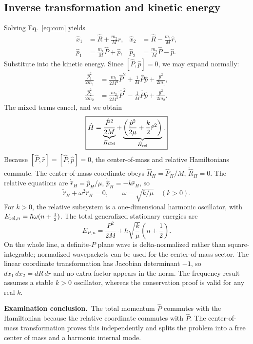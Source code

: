 \documentclass[11pt,a4paper]{article}
\theoremstyle{definition}
\newcommand{\exam}[1]{\par\medskip\noindent\textbf{Examination conclusion.}\ #1\par}
\begin{document}
\subsection{Inverse transformation and kinetic energy}
Solving Eq.~\eqref{eq:com} yields
\begin{align}
\hat x_1&=\hat R+\frac{m_2}{M}\hat r,&\hat x_2&=\hat R-\frac{m_1}{M}\hat r,\\
\hat p_1&=\frac{m_1}{M}\hat P+\hat p,&\hat p_2&=\frac{m_2}{M}\hat P-\hat p.
\end{align}
Substitute into the kinetic energy. Since \([\hat P,\hat p]=0\), we may expand normally:
\begin{align}
\frac{\hat p_1^2}{2m_1}&=\frac{m_1}{2M^2}\hat P^2+\frac1M\hat P\hat p+\frac{\hat p^2}{2m_1},\\
\frac{\hat p_2^2}{2m_2}&=\frac{m_2}{2M^2}\hat P^2-\frac1M\hat P\hat p+\frac{\hat p^2}{2m_2}.
\end{align}
The mixed terms cancel, and we obtain
\begin{equation}
\boxed{\hat H=\underbrace{\frac{\hat P^2}{2M}}_{\hat H_{\rm CM}}
+\underbrace{\left(\frac{\hat p^2}{2\mu}+\frac{k}{2}\hat r^2\right)}_{\hat H_{\rm rel}}.}
\label{eq:separate}
\end{equation}
Because \([\hat P,\hat r]=[\hat P,\hat p]=0\), the center-of-mass and relative Hamiltonians commute. The center-of-mass coordinate obeys \(\dot{\hat R}_H=\hat P_H/M\), \(\ddot{\hat R}_H=0\). The relative equations are \(\dot{\hat r}_H=\hat p_H/\mu\), \(\dot{\hat p}_H=-k\hat r_H\), so
\begin{equation}
\ddot{\hat r}_H+\omega^2\hat r_H=0,\qquad \omega=\sqrt{k/\mu}\quad(k>0).
\end{equation}
For \(k>0\), the relative subsystem is a one-dimensional harmonic oscillator, with \(E_{{\rm rel},n}=\hbar\omega(n+\frac12)\). The total generalized stationary energies are
\begin{equation}
\boxed{E_{P,n}=\frac{P^2}{2M}+\hbar\sqrt{\frac{k}{\mu}}\left(n+\frac12\right).}
\end{equation}
On the whole line, a definite-\(P\) plane wave is delta-normalized rather than square-integrable; normalized wavepackets can be used for the center-of-mass sector. The linear coordinate transformation has Jacobian determinant \(-1\), so \(dx_1\,dx_2=dR\,dr\) and no extra factor appears in the norm. The frequency result assumes a stable \(k>0\) oscillator, whereas the conservation proof is valid for any real \(k\).
\exam{The total momentum \(\hat P\) commutes with the Hamiltonian because the relative coordinate commutes with \(\hat P\). The center-of-mass transformation proves this independently and splits the problem into a free center of mass and a harmonic internal mode.}
\end{document}
